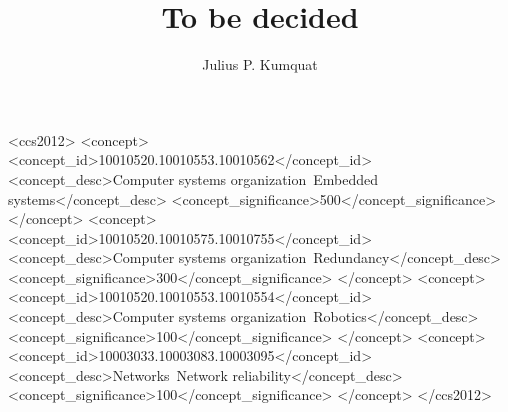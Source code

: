 \documentclass[10pt,sigconf,letterpaper,anonymous]{acmart}
\begin{document}
\title{To be decided}



\author{Julius P. Kumquat}

\renewcommand{\shortauthors}{Trovato and Tobin, et al.}

\begin{abstract}
 

 
 
\end{abstract}

\begin{CCSXML}
<ccs2012>
 <concept>
  <concept_id>10010520.10010553.10010562</concept_id>
  <concept_desc>Computer systems organization~Embedded systems</concept_desc>
  <concept_significance>500</concept_significance>
 </concept>
 <concept>
  <concept_id>10010520.10010575.10010755</concept_id>
  <concept_desc>Computer systems organization~Redundancy</concept_desc>
  <concept_significance>300</concept_significance>
 </concept>
 <concept>
  <concept_id>10010520.10010553.10010554</concept_id>
  <concept_desc>Computer systems organization~Robotics</concept_desc>
  <concept_significance>100</concept_significance>
 </concept>
 <concept>
  <concept_id>10003033.10003083.10003095</concept_id>
  <concept_desc>Networks~Network reliability</concept_desc>
  <concept_significance>100</concept_significance>
 </concept>
</ccs2012>
\end{CCSXML}

\end{document}
